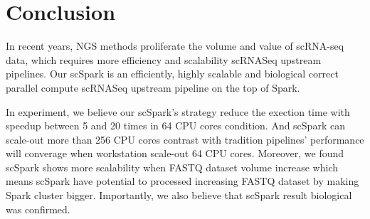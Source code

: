 \documentclass[conference]{IEEEtran}
\begin{document}
\section{Conclusion}

In recent years, NGS methods proliferate the volume and value of scRNA-seq data, which requires more efficiency and scalability scRNASeq upstream pipelines.
Our scSpark is an efficiently, highly scalable and biological correct parallel compute scRNASeq upstream pipeline on the top of Spark.

In experiment, we believe our scSpark's strategy reduce the exection time with speedup between 5 and 20 times in 64 CPU cores condition.
And scSpark can scale-out more than 256 CPU cores contrast with tradition pipelines' performance will converage when workstation scale-out 64 CPU cores.
Moreover, we found scSpark shows more scalability when FASTQ dataset volume increase which means scSpark have potential to processed increasing FASTQ dataset by making Spark cluster bigger.
Importantly, we also believe that scSpark result biological was confirmed.



\end{document}
